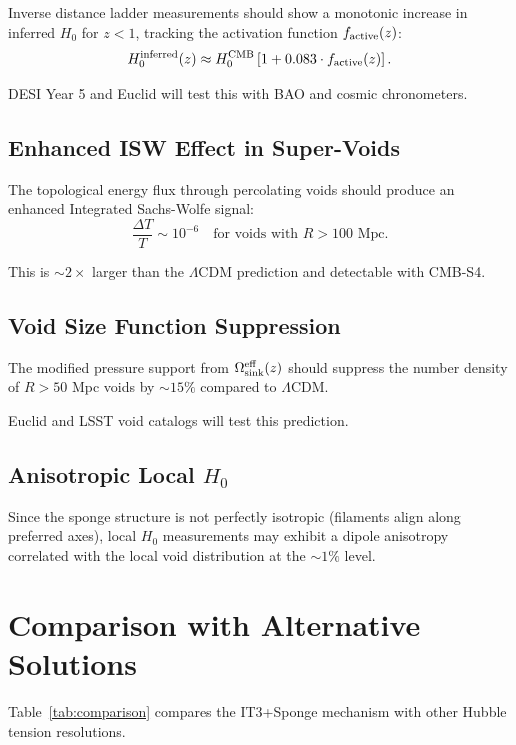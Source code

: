 \documentclass[12pt,a4paper]{article}
\begin{document}
Inverse distance ladder measurements should show a monotonic increase in inferred $H_0$ for $z < 1$, tracking the activation function $f_{\rm active}(z)$:
\begin{equation}
H_0^{\rm inferred}(z) \approx H_0^{\rm CMB} \left[ 1 + 0.083 \cdot f_{\rm active}(z) \right].
\end{equation}

DESI Year 5 and Euclid will test this with BAO and cosmic chronometers.

\subsection{Enhanced ISW Effect in Super-Voids}

The topological energy flux through percolating voids should produce an enhanced Integrated Sachs-Wolfe signal:
\begin{equation}
\frac{\Delta T}{T} \sim 10^{-6} \quad \text{for voids with } R > 100 \text{ Mpc}.
\end{equation}

This is $\sim 2\times$ larger than the $\Lambda$CDM prediction and detectable with CMB-S4.

\subsection{Void Size Function Suppression}

The modified pressure support from $\Omega_{\rm sink}^{\rm eff}(z)$ should suppress the number density of $R > 50$ Mpc voids by $\sim 15\%$ compared to $\Lambda$CDM.

Euclid and LSST void catalogs will test this prediction.

\subsection{Anisotropic Local $H_0$}

Since the sponge structure is not perfectly isotropic (filaments align along preferred axes), local $H_0$ measurements may exhibit a dipole anisotropy correlated with the local void distribution at the $\sim 1\%$ level.

\section{Comparison with Alternative Solutions}

Table~\ref{tab:comparison} compares the IT3+Sponge mechanism with other Hubble tension resolutions.
\end{document}
